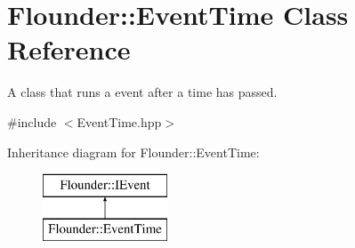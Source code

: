 \hypertarget{class_flounder_1_1_event_time}{}\section{Flounder\+:\+:Event\+Time Class Reference}
\label{class_flounder_1_1_event_time}


A class that runs a event after a time has passed.  




{\ttfamily \#include $<$Event\+Time.\+hpp$>$}

Inheritance diagram for Flounder\+:\+:Event\+Time\+:\begin{figure}[H]
\begin{center}
\leavevmode
\includegraphics[height=2.000000cm]{class_flounder_1_1_event_time}
\end{center}
\end{figure}
